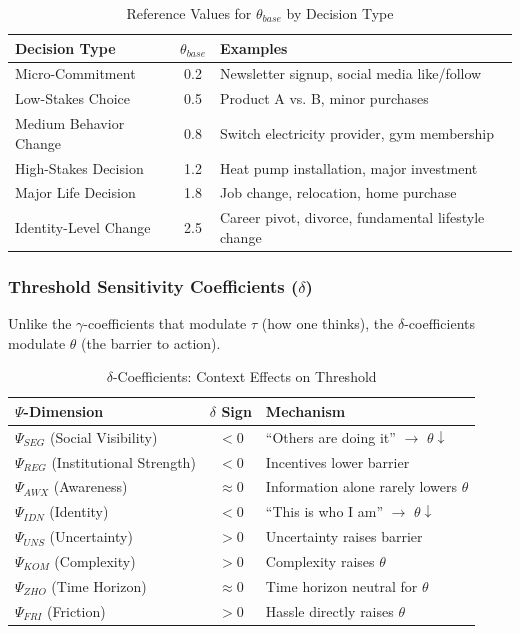 \begin{table}[htbp]
\centering
\caption{Reference Values for $\theta_{base}$ by Decision Type}
\label{tab:theta-base}
\begin{tabular}{@{}lcp{5cm}@{}}
\toprule
\textbf{Decision Type} & $\theta_{base}$ & \textbf{Examples} \\
\midrule
Micro-Commitment & 0.2 & Newsletter signup, social media like/follow \\
Low-Stakes Choice & 0.5 & Product A vs. B, minor purchases \\
Medium Behavior Change & 0.8 & Switch electricity provider, gym membership \\
High-Stakes Decision & 1.2 & Heat pump installation, major investment \\
Major Life Decision & 1.8 & Job change, relocation, home purchase \\
Identity-Level Change & 2.5 & Career pivot, divorce, fundamental lifestyle change \\
\bottomrule
\end{tabular}
\end{table}

\subsubsection{Threshold Sensitivity Coefficients ($\delta$)}

Unlike the $\gamma$-coefficients that modulate $\tau$ (how one thinks), the $\delta$-coefficients modulate $\theta$ (the barrier to action).

\begin{table}[htbp]
\centering
\caption{$\delta$-Coefficients: Context Effects on Threshold}
\label{tab:delta-coefficients}
\begin{tabular}{@{}lcl@{}}
\toprule
\textbf{$\Psi$-Dimension} & \textbf{$\delta$ Sign} & \textbf{Mechanism} \\
\midrule
$\Psi_{SEG}$ (Social Visibility) & $< 0$ & ``Others are doing it'' $\rightarrow$ $\theta \downarrow$ \\
$\Psi_{REG}$ (Institutional Strength) & $< 0$ & Incentives lower barrier \\
$\Psi_{AWX}$ (Awareness) & $\approx 0$ & Information alone rarely lowers $\theta$ \\
$\Psi_{IDN}$ (Identity) & $< 0$ & ``This is who I am'' $\rightarrow$ $\theta \downarrow$ \\
$\Psi_{UNS}$ (Uncertainty) & $> 0$ & Uncertainty raises barrier \\
$\Psi_{KOM}$ (Complexity) & $> 0$ & Complexity raises $\theta$ \\
$\Psi_{ZHO}$ (Time Horizon) & $\approx 0$ & Time horizon neutral for $\theta$ \\
$\Psi_{FRI}$ (Friction) & $> 0$ & Hassle directly raises $\theta$ \\
\bottomrule
\end{tabular}
\end{table}

